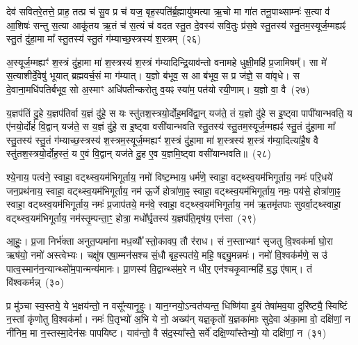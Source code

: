 {\anuvakamend[{ते॒ पृ॒ष॒दा॒ज्यं प्रा॒णो वै योनेः᳚ प्रा॒णं द्वाविꣳ॑शतिश्च}]}%

देव॑ सवितरे॒तत्ते॒ प्राह॒ तत्प्र च॑ सु॒व प्र च॑ यज॒ बृह॒स्पति॑र्ब्र॒ह्मायु॑ष्मत्या ऋ॒चो मा गा॑त तनू॒पाथ्साम्नः॑ स॒त्या व॑ आ॒शिषः॑ सन्तु स॒त्या आकू॑तय ऋ॒तं च॑ स॒त्यं च॑ वदत स्तु॒त दे॒वस्य॑ सवि॒तुः प्र॑स॒वे स्तु॒तस्य॑ स्तु॒तम॒स्यूर्ज॒म्मह्यꣴ॑ स्तु॒तं दु॑हा॒मा मा᳚ स्तु॒तस्य॑ स्तु॒तं ग॑म्याच्छ॒स्त्रस्य॑ श॒स्त्रम्~(२६)

अ॒स्यूर्ज॒म्मह्यꣳ॑ श॒स्त्रं दु॑हा॒मा मा॑ श॒स्त्रस्य॑ श॒स्त्रं ग॑म्यादिन्द्रि॒याव॑न्तो वनामहे धुक्षी॒महि॑ प्र॒जामिषम्᳚। सा मे॑ स॒त्याशीर्दे॒वेषु॑ भूयात् ब्रह्मवर्च॒सं मा ग॑म्यात्। य॒ज्ञो ब॑भूव॒ स आ ब॑भूव॒ स प्र ज॑ज्ञे॒ स वा॑वृधे। स दे॒वाना॒मधि॑पतिर्बभूव॒ सो अ॒स्माꣳ अधि॑पतीन्करोतु व॒यꣴ स्या॑म॒ पत॑यो रयी॒णाम्। य॒ज्ञो वा॒ वै~(२७)

य॒ज्ञप॑तिं दु॒हे य॒ज्ञप॑तिर्वा य॒ज्ञं दु॑हे॒ स यः स्तु॑तश॒स्त्रयो॒र्दोह॒मवि॑द्वा॒न् यज॑ते॒ तं य॒ज्ञो दु॑हे स इ॒ष्ट्वा पापी॑यान्भवति॒ य ए॑नयो॒र्दोहं॑ वि॒द्वान् यज॑ते॒ स य॒ज्ञं दु॑हे॒ स इ॒ष्ट्वा वसी॑यान्भवति स्तु॒तस्य॑ स्तु॒तम॒स्यूर्ज॒म्मह्यꣴ॑ स्तु॒तं दु॑हा॒मा मा᳚ स्तु॒तस्य॑ स्तु॒तं ग॑म्याच्छ॒स्त्रस्य॑ श॒स्त्रम॒स्यूर्ज॒म्मह्यꣳ॑ श॒स्त्रं दु॑हा॒मा मा॑ श॒स्त्रस्य॑ श॒स्त्रं ग॑म्या॒दित्या॑है॒ष वै स्तु॑तश॒स्त्रयो॒र्दोह॒स्तं॒ य ए॒वं वि॒द्वान् यज॑ते दु॒ह ए॒व य॒ज्ञमि॒ष्ट्वा वसी॑यान्भवति॥~(२८)

{\anuvakamend[{श॒स्त्रं वै श॒स्त्रन्दु॑हा॒न्द्वाविꣳ॑शतिश्च}]}%

श्ये॒नाय॒ पत्व॑ने॒ स्वाहा॒ वट्थ्स्व॒यम॑भिगूर्ताय॒ नमो॑ विष्ट॒म्भाय॒ धर्म॑णे॒ स्वाहा॒ वट्थ्स्व॒यम॑भिगूर्ताय॒ नमः॑ परि॒धये॑ जन॒प्रथ॑नाय॒ स्वाहा॒ वट्थ्स्व॒यम॑भिगूर्ताय॒ नम॑ ऊ॒र्जे होत्रा॑णा॒ꣴ॒ स्वाहा॒ वट्थ्स्व॒यम॑भिगूर्ताय॒ नमः॒ पय॑से॒ होत्रा॑णा॒ꣴ॒ स्वाहा॒ वट्थ्स्व॒यम॑भिगूर्ताय॒ नमः॑ प्र॒जाप॑तये॒ मन॑वे॒ स्वाहा॒ वट्थ्स्व॒यम॑भिगूर्ताय॒ नम॑ ऋ॒तमृ॑तपाः सुवर्वा॒ट्थ्स्वाहा॒ वट्थ्स्व॒यम॑भिगूर्ताय॒ नम॑स्तृ॒म्पन्ता॒ꣳ॒ होत्रा॒ मधो᳚र्घृ॒तस्य॑ य॒ज्ञप॑ति॒मृष॑य॒ एन॑सा~(२९)

आ॒हुः॒। प्र॒जा निर्भ॑क्ता अनुत॒प्यमा॑ना मध॒व्यौ᳚ स्तो॒कावप॒ तौ र॑राध। सं न॒स्ताभ्याꣳ॑ सृजतु वि॒श्वक॑र्मा घो॒रा ऋष॑यो॒ नमो॑ अस्त्वेभ्यः। चक्षु॑ष एषा॒म्मन॑सश्च सं॒धौ बृह॒स्पत॑ये॒ महि॒ षद्द्यु॒मन्नमः॑। नमो॑ वि॒श्वक॑र्मणे॒ स उ॑ पात्व॒स्मान॑न॒न्यान्थ्सो॑म॒पान्मन्य॑मानः। प्रा॒णस्य॑ वि॒द्वान्थ्स॑म॒रे न धीर॒ एन॑श्चकृ॒वान्महि॑ ब॒द्ध ए॑षाम्। तं वि॑श्वकर्मन्न्~(३०)

प्र मु॑ञ्चा स्व॒स्तये॒ ये भ॒क्षय॑न्तो॒ न वसू᳚न्यानृ॒हुः। यान॒ग्नयो॒\-ऽन्वत॑प्यन्त॒ धिष्णि॑या इ॒यं तेषा॑मव॒या दुरि॑ष्ट्यै॒ स्विष्टिं न॒स्तां कृ॑णोतु वि॒श्वक॑र्मा। नमः॑ पि॒तृभ्यो॑ अ॒भि ये नो॒ अख्य॑न् यज्ञ॒कृतो॑ य॒ज्ञका॑माः सुदे॒वा अ॑का॒मा वो॒ दक्षि॑णां॒ न नी॑निम॒ मा न॒स्तस्मा॒देन॑सः पापयिष्ट। याव॑न्तो॒ वै स॑द॒स्या᳚स्ते॒ सर्वे॑ दक्षि॒ण्या᳚स्तेभ्यो॒ यो दक्षि॑णां॒ न~(३१)

